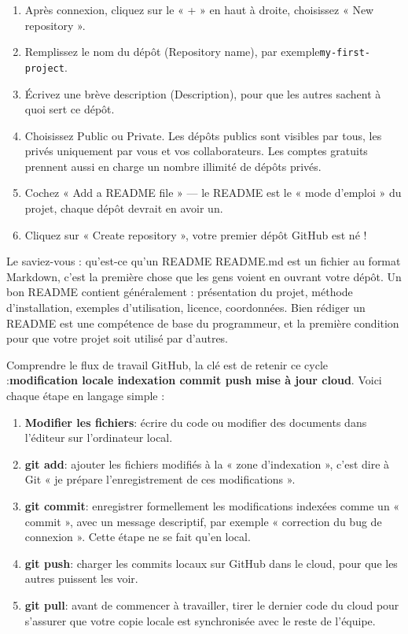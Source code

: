 
\begin{enumerate}
  \item Après connexion, cliquez sur le « + » en haut à droite, choisissez « New repository ».
  \item Remplissez le nom du dépôt (Repository name), par exemple\texttt{my-\allowbreak first-\allowbreak project}.
  \item Écrivez une brève description (Description), pour que les autres sachent à quoi sert ce dépôt.
  \item Choisissez Public ou Private. Les dépôts publics sont visibles par tous, les privés uniquement par vous et vos collaborateurs. Les comptes gratuits prennent aussi en charge un nombre illimité de dépôts privés.
  \item Cochez « Add a README file » — le README est le « mode d'emploi » du projet, chaque dépôt devrait en avoir un.
  \item Cliquez sur « Create repository », votre premier dépôt GitHub est né !
\end{enumerate}

\begin{tcbinfo}{Le saviez-vous : qu'est-ce qu'un README}
README.md est un fichier au format Markdown, c'est la première chose que les gens voient en ouvrant votre dépôt. Un bon README contient généralement : présentation du projet, méthode d'installation, exemples d'utilisation, licence, coordonnées. Bien rédiger un README est une compétence de base du programmeur, et la première condition pour que votre projet soit utilisé par d'autres.

\end{tcbinfo}


Comprendre le flux de travail GitHub, la clé est de retenir ce cycle :\textbf{modification locale indexation commit push mise à jour cloud}. Voici chaque étape en langage simple :

\begin{enumerate}
  \item \textbf{Modifier les fichiers}: écrire du code ou modifier des documents dans l’éditeur sur l’ordinateur local.
  \item \textbf{git add}: ajouter les fichiers modifiés à la « zone d’indexation », c’est dire à Git « je prépare l’enregistrement de ces modifications ».
  \item \textbf{git commit}: enregistrer formellement les modifications indexées comme un « commit », avec un message descriptif, par exemple « correction du bug de connexion ». Cette étape ne se fait qu’en local.
  \item \textbf{git push}: charger les commits locaux sur GitHub dans le cloud, pour que les autres puissent les voir.
  \item \textbf{git pull}: avant de commencer à travailler, tirer le dernier code du cloud pour s’assurer que votre copie locale est synchronisée avec le reste de l’équipe.
\end{enumerate}


